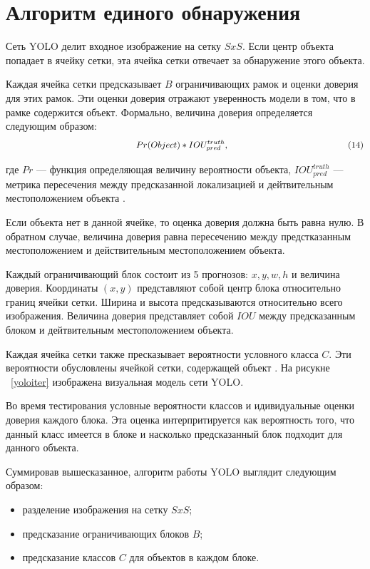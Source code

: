 \documentclass[a4paper,english,russian]{G2-105}
\begin{document}
\section{Алгоритм единого обнаружения} \ttl
\par Сеть YOLO делит входное изображение на сетку $SxS$. Если центр объекта попадает в ячейку сетки, эта ячейка сетки отвечает за обнаружение этого объекта.
\par Каждая ячейка сетки предсказывает $B$ ограничивающих рамок и оценки доверия для этих рамок. Эти оценки доверия отражают уверенность модели в том, что в рамке содержится объект. Формально, величина доверия определяется следующим образом:
\[
\ \hspace*{50mm} Pr(Object)*IOU_{pred}^{truth},  \ \hspace*{46mm} (14)
\]
\par где $Pr$ --- функция определяющая величину вероятности объекта, $IOU_{pred}^{truth}$ --- метрика пересечения между предсказанной локализацией и дейтвительным местоположением объекта \cite{17}.
\par Если объекта нет в данной ячейке, то оценка доверия должна быть равна нулю. В обратном случае, величина доверия равна пересечению между предстказанным местоположением и действительным местоположением объекта.
\par Каждый ограничивающий блок состоит из 5 прогнозов: $x, y, w, h$ и величина доверия. Координаты $(x, y)$ представляют собой центр блока относительно границ ячейки сетки. Ширина и высота предсказываются относительно всего изображения. Величина доверия представляет собой $IOU$ между предсказанным блоком и дейтвительным местоположением объекта.
\par Каждая ячейка сетки также пресказывает вероятности условного класса $C$. Эти вероятности обусловлены ячейкой сетки, содержащей объект \cite{18}. На рисукне ~\ref{yoloiter} изображена визуальная модель сети YOLO.
\par Во время тестирования условные вероятности классов и идивидуальные оценки доверия каждого блока. Эта оценка интерпритируется как вероятность того, что данный класс имеется в блоке и насколько предсказанный блок подходит для данного объекта. 
\par Суммировав вышесказанное, алгоритм работы YOLO выглядит следующим образом:
\begin{itemize}
\item разделение изображения на сетку $SxS$;
\item предсказание ограничивающих блоков $B$;
\item предсказание классов $C$ для объектов в каждом блоке.
\end{itemize}
\end{document}
